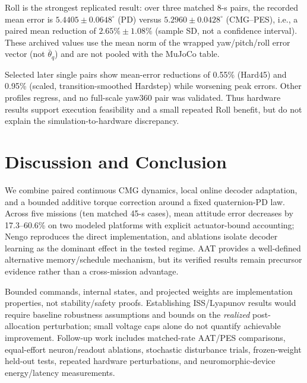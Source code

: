 \documentclass[letterpaper,10pt,conference]{IEEEtran}
\begin{document}
Roll is the strongest replicated result: over three matched 8-s pairs, the
recorded mean error is $5.4405\pm0.0648^\circ$ (PD) versus
$5.2960\pm0.0428^\circ$ (CMG--PES), i.e., a paired mean reduction of
$2.65\%\pm1.08\%$ (sample SD, not a confidence interval). These archived
values use the mean norm of the wrapped yaw/pitch/roll error vector (not
$\bar\theta_q$) and are not pooled with the MuJoCo table.

Selected later single pairs show mean-error reductions of 0.55\% (Hard45)
and 0.95\% (scaled, transition-smoothed Hardstep) while worsening peak
errors. Other profiles regress, and no full-scale yaw360 pair was validated.
Thus hardware results support execution feasibility and a small repeated Roll
benefit, but do not explain the simulation-to-hardware discrepancy.

\section{Discussion and Conclusion}
We combine paired continuous CMG dynamics, local online decoder adaptation,
and a bounded additive torque correction around a fixed quaternion-PD law.
Across five missions (ten matched 45-s cases), mean attitude error decreases
by 17.3--60.6\% on two modeled platforms with explicit actuator-bound
accounting; Nengo reproduces the direct implementation, and ablations isolate
decoder learning as the dominant effect in the tested regime. AAT provides a
well-defined alternative memory/schedule mechanism, but its verified results
remain precursor evidence rather than a cross-mission advantage.

Bounded commands, internal states, and projected weights are implementation
properties, not stability/safety proofs. Establishing ISS/Lyapunov results
would require baseline robustness assumptions and bounds on the \emph{realized}
post-allocation perturbation; small voltage caps alone do not quantify
achievable improvement. Follow-up work includes matched-rate AAT/PES
comparisons, equal-effort neuron/readout ablations, stochastic disturbance
trials, frozen-weight held-out tests, repeated hardware perturbations, and
neuromorphic-device energy/latency measurements.



\end{document}

